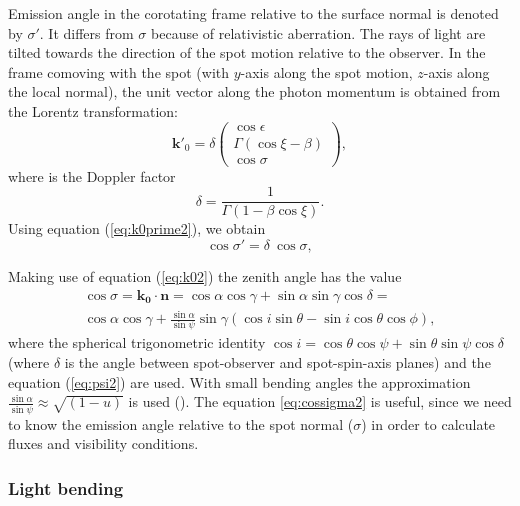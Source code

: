 \documentclass{wihuri}
\def\be{\begin{equation}}
\def\ee{\end{equation}}
\def\Dop{\delta}
\newcommand{\bmath}[1]{\boldsymbol{#1}}
\begin{document}

Emission angle in the corotating frame relative to the surface normal is denoted by
$\sigma'$.  It differs from $\sigma$ because of relativistic aberration. The rays of light are tilted towards the direction of the spot motion relative to the observer.
In the frame comoving with the spot 
(with $y$-axis along the spot motion, $z$-axis along the local normal), 
the unit vector along the photon momentum  is 
obtained from the Lorentz transformation: 
\be \label{eq:k0prime2}
\bmath{k}'_0 = \Dop
\left( \begin{array}{c}
\cos \epsilon \\
\Gamma (\cos\xi-\beta)\\ 
\cos\sigma
\end{array}
\right) ,
\ee 
where is the Doppler factor 
\be \label{eq:dop2}
\Dop=\frac{1}{\Gamma(1-\beta\cos\xi)} .
\ee
Using equation (\ref{eq:k0prime2}), we obtain
\be \label{eq:aberr2}
\cos\sigma' =   \Dop \ \cos\sigma ,
\ee
 
Making use of equation (\ref{eq:k02}) the zenith angle has the value
\be\label{eq:cossigma2}
\begin{split}
\cos\sigma = \bmath{k_{0}}\cdot\bmath{n} = \cos\alpha\cos\gamma+\sin\alpha\sin\gamma\cos\delta = \\
\cos \alpha  \cos \gamma + \frac{\sin \alpha}{\sin \psi} \sin \gamma (\cos i \sin \theta - \sin i \cos \theta \cos \phi),
\end{split}
\ee
where the spherical trigonometric identity $\cos i = \cos\theta\cos\psi+\sin\theta\sin\psi\cos\delta$ (where $\delta$ is the angle between spot-observer and spot-spin-axis planes) and the equation (\ref{eq:psi2}) are used. With small bending angles the approximation $\frac{\sin \alpha}{\sin \psi} \approx \sqrt{(1-u)}$ is used (\cite{beloborodov}). 
The equation \ref{eq:cossigma2} is useful, since we need to know the emission angle relative to the spot normal ($\sigma$) in order to calculate fluxes and visibility conditions. 


\subsubsection{Light bending}
\end{document}
